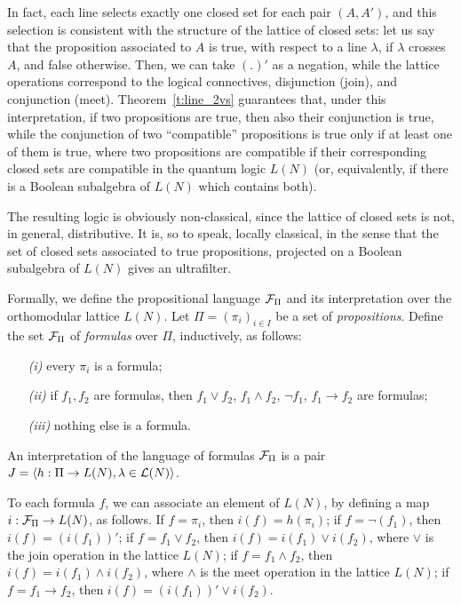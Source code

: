 \documentclass{eptcs}
\begin{document}
In fact, each line selects exactly one closed set for each pair
$(A, A')$, and this selection is consistent with the structure
of the lattice of closed sets: let us say that the proposition
associated to $A$ is true, with respect to a line $\lambda$,
if $\lambda$ crosses $A$, and false otherwise.
Then, we can take $(.)'$ as a negation, while the lattice
operations correspond to the logical connectives, disjunction
(join), and conjunction (meet). Theorem~\ref{t:line_2vs}
guarantees that, under this interpretation, if two propositions
are true, then also their conjunction is true, while the
conjunction of two ``compatible'' propositions is true only
if at least one of them is true, where two propositions are
compatible if their corresponding closed sets are compatible
in the quantum logic $L(N)$ (or, equivalently, if there is
a Boolean subalgebra of $L(N)$ which contains both).

The resulting logic is obviously non-classical, since the lattice
of closed sets is not, in general, distributive. It is, so to
speak, locally classical, in the sense that the set of closed
sets associated to true propositions, projected on a Boolean
subalgebra of $L(N)$ gives an ultrafilter.

Formally, we define the propositional language ${\cal F}_\Pi$
and its interpretation over the orthomodular lattice $L(N)$.
Let $\Pi = (\pi_i)_{i\in I}$ be a set of \emph{propositions}.
Define the set ${\cal F}_\Pi$ of \emph{formulas} over $\Pi$, inductively,
as follows:
\begin{itemize}
  \item [\emph{(i)}] every $\pi_i$ is a formula;
  \item [\emph{(ii)}] if $f_1, f_2$ are formulas, then
        $f_1 \vee f_2$, $f_1 \wedge f_2$, $\neg f_1$, $f_1 \rightarrow f_2$
        are formulas;
  \item [\emph{(iii)}] nothing else is a formula.
\end{itemize}
An interpretation of the language of formulas ${\cal F}_\Pi$ is a pair
$J = \langle h: \Pi \rightarrow L(N), \lambda \in \mathcal{L}(N) \rangle$.

To each formula $f$, we can associate an element of $L(N)$,
by defining a map $i:{\cal F}_\Pi \rightarrow L(N)$, as follows.
If $f = \pi_i$, then $i(f) = h(\pi_i)$; if $f = \neg(f_1)$, then
$i(f) = (i(f_1))'$;
if $f = f_1 \vee f_2$, then $i(f) = i(f_1) \vee i(f_2)$, where
$\vee$ is the join operation in the lattice $L(N)$;
if $f = f_1 \wedge f_2$, then $i(f) = i(f_1) \wedge i(f_2)$, where
$\wedge$ is the meet operation in the lattice $L(N)$;
if $f = f_1 \rightarrow f_2$, then
$i(f) = (i(f_1))' \vee i(f_2)$.
\end{document}
